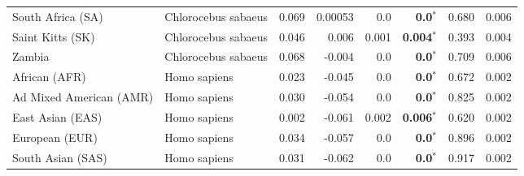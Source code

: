 \begin{center}
\begin{adjustbox}{width = 1\textwidth}
\begin{tabular}{|l|l|r|r|r|r|r|r|}
              South Africa (SA) &  Chlorocebus sabaeus &                                              0.069 &                                            0.00053 &              0.0 &                    \textbf{0.0}$\bm{^*}$ &                                              0.680 &              0.006 \\
               Saint Kitts (SK) &  Chlorocebus sabaeus &                                              0.046 &                                              0.006 &            0.001 &                  \textbf{0.004}$\bm{^*}$ &                                              0.393 &              0.004 \\
                         Zambia &  Chlorocebus sabaeus &                                              0.068 &                                             -0.004 &              0.0 &                    \textbf{0.0}$\bm{^*}$ &                                              0.709 &              0.006 \\
                  African (AFR) &         Homo sapiens &                                              0.023 &                                             -0.045 &              0.0 &                    \textbf{0.0}$\bm{^*}$ &                                              0.672 &              0.002 \\
        Ad Mixed American (AMR) &         Homo sapiens &                                              0.030 &                                             -0.054 &              0.0 &                    \textbf{0.0}$\bm{^*}$ &                                              0.825 &              0.002 \\
               East Asian (EAS) &         Homo sapiens &                                              0.002 &                                             -0.061 &            0.002 &                  \textbf{0.006}$\bm{^*}$ &                                              0.620 &              0.002 \\
                 European (EUR) &         Homo sapiens &                                              0.034 &                                             -0.057 &              0.0 &                    \textbf{0.0}$\bm{^*}$ &                                              0.896 &              0.002 \\
              South Asian (SAS) &         Homo sapiens &                                              0.031 &                                             -0.062 &              0.0 &                    \textbf{0.0}$\bm{^*}$ &                                              0.917 &              0.002 \\

\end{tabular}
\end{adjustbox}
\end{center}
